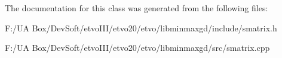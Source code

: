 The documentation for this class was generated from the following files\+:\begin{DoxyCompactItemize}
\item 
F\+:/\+U\+A Box/\+Dev\+Soft/etvo\+I\+I\+I/etvo20/etvo/libminmaxgd/include/smatrix.\+h\item 
F\+:/\+U\+A Box/\+Dev\+Soft/etvo\+I\+I\+I/etvo20/etvo/libminmaxgd/src/smatrix.\+cpp\end{DoxyCompactItemize}
